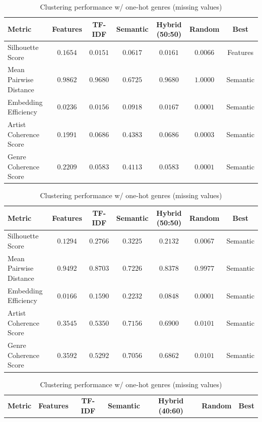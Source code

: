 \documentclass{article}
\begin{document}
\begin{table}[h!]
\centering
\footnotesize
\begin{tabular}{l|cccccc}
\textbf{Metric} & \textbf{Features} & \textbf{TF-IDF} & \textbf{Semantic} & \textbf{Hybrid (50:50)} & \textbf{Random} & \textbf{Best} \\
\hline
Silhouette Score               & $\mathbf{0.1654}$ & $0.0151$ & $0.0617$ & $0.0161$ & $0.0066$ & Features \\
Mean Pairwise Distance         & $0.9862$ & $0.9680$ & $\mathbf{0.6725}$ & $0.9680$ & $1.0000$ & Semantic \\
Embedding Efficiency           & $0.0236$ & $0.0156$ & $\mathbf{0.0918}$ & $0.0167$ & $0.0001$ & Semantic \\
Artist Coherence Score         & $0.1991$ & $0.0686$ & $\mathbf{0.4383}$ & $0.0686$ & $0.0003$ & Semantic \\
Genre Coherence Score          & $0.2209$ & $0.0583$ & $\mathbf{0.4113}$ & $0.0583$ & $0.0001$ & Semantic \\
\end{tabular}
\vspace{0.25em}
\caption{Clustering performance across embedding types w/o genre}
\label{tab:prediction-clustering-base}
\centering
\footnotesize
\begin{tabular}{l|cccccc}
\textbf{Metric} & \textbf{Features} & \textbf{TF-IDF} & \textbf{Semantic} & \textbf{Hybrid (50:50)} & \textbf{Random} & \textbf{Best} \\
\hline
Silhouette Score           & $0.1294$ & $0.2766$ & $\mathbf{0.3225}$ & $0.2132$ & $0.0067$ & Semantic \\
Mean Pairwise Distance     & $0.9492$ & $0.8703$ & $\mathbf{0.7226}$ & $0.8378$ & $0.9977$ & Semantic \\
Embedding Efficiency       & $0.0166$ & $0.1590$ & $\mathbf{0.2232}$ & $0.0848$ & $0.0001$ & Semantic \\
Artist Coherence Score     & $0.3545$ & $0.5350$ & $\mathbf{0.7156}$ & $0.6900$ & $0.0101$ & Semantic \\
Genre Coherence Score      & $0.3592$ & $0.5292$ & $\mathbf{0.7056}$ & $0.6862$ & $0.0101$ & Semantic \\
\end{tabular}
\vspace{0.25em}
\caption{Clustering performance w/ one-hot genres (missing values)}
\label{tab:prediction-clustering-one-hot}
\begin{tabular}{l|cccccc}
\textbf{Metric} & \textbf{Features} & \textbf{TF-IDF} & \textbf{Semantic} & \textbf{Hybrid (40:60)} & \textbf{Random} & \textbf{Best} \\

\end{tabular}
\end{table}
\end{document}
